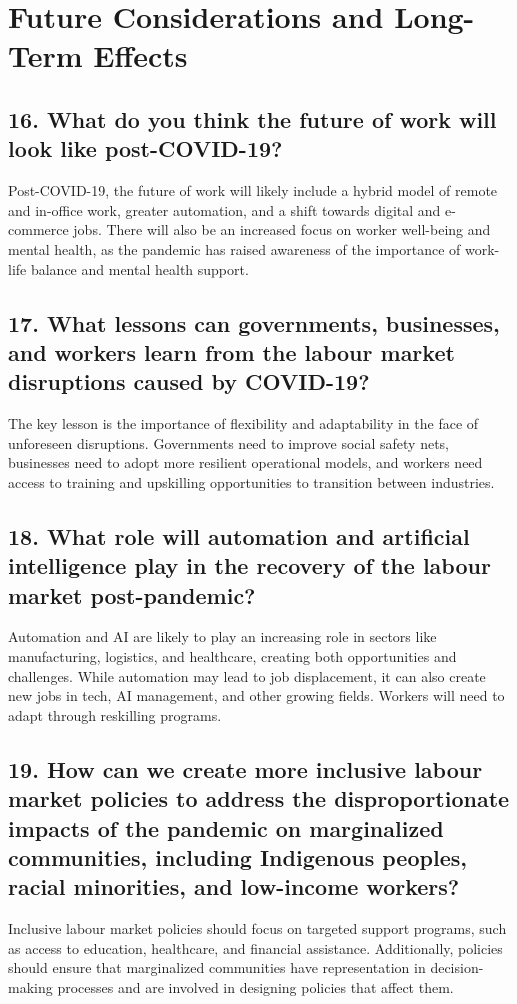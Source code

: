 \documentclass[12pt]{article}
\begin{document}
\section*{Future Considerations and Long-Term Effects}

\subsection*{16. What do you think the future of work will look like post-COVID-19?}
Post-COVID-19, the future of work will likely include a hybrid model of remote and in-office work, greater automation, and a shift towards digital and e-commerce jobs. There will also be an increased focus on worker well-being and mental health, as the pandemic has raised awareness of the importance of work-life balance and mental health support.

\subsection*{17. What lessons can governments, businesses, and workers learn from the labour market disruptions caused by COVID-19?}
The key lesson is the importance of flexibility and adaptability in the face of unforeseen disruptions. Governments need to improve social safety nets, businesses need to adopt more resilient operational models, and workers need access to training and upskilling opportunities to transition between industries.

\subsection*{18. What role will automation and artificial intelligence play in the recovery of the labour market post-pandemic?}
Automation and AI are likely to play an increasing role in sectors like manufacturing, logistics, and healthcare, creating both opportunities and challenges. While automation may lead to job displacement, it can also create new jobs in tech, AI management, and other growing fields. Workers will need to adapt through reskilling programs.

\subsection*{19. How can we create more inclusive labour market policies to address the disproportionate impacts of the pandemic on marginalized communities, including Indigenous peoples, racial minorities, and low-income workers?}
Inclusive labour market policies should focus on targeted support programs, such as access to education, healthcare, and financial assistance. Additionally, policies should ensure that marginalized communities have representation in decision-making processes and are involved in designing policies that affect them.
\end{document}
